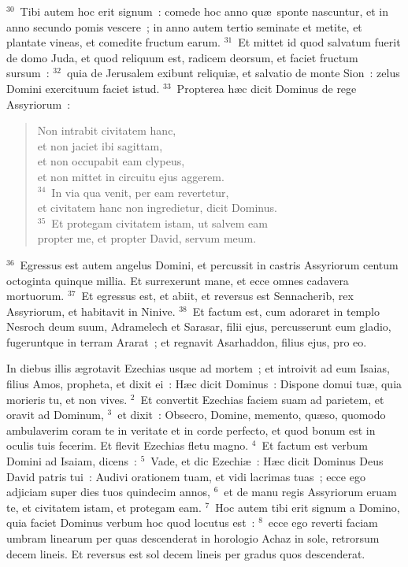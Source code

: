 ${}^{30}$~Tibi autem hoc erit signum~: comede hoc anno qu\ae\ sponte nascuntur, et in anno secundo pomis vescere~; in anno autem tertio seminate et metite, et plantate vineas, et comedite fructum earum.
${}^{31}$~Et mittet id quod salvatum fuerit de domo Juda, et quod reliquum est, radicem deorsum, et faciet fructum sursum~:
${}^{32}$~quia de Jerusalem exibunt reliqui\ae , et salvatio de monte Sion~: zelus Domini exercituum faciet istud.
${}^{33}$~Propterea h\ae c dicit Dominus de rege Assyriorum~: \begin{flushleft}\begin{verse}Non intrabit civitatem hanc,\\ et non jaciet ibi sagittam,\\ et non occupabit eam clypeus,\\ et non mittet in circuitu ejus aggerem.\\
${}^{34}$~In via qua venit, per eam revertetur,\\ et civitatem hanc non ingredietur, dicit Dominus.\\
${}^{35}$~Et protegam civitatem istam, ut salvem eam\\ propter me, et propter David, servum meum.\end{verse}\end{flushleft}


${}^{36}$~Egressus est autem angelus Domini, et percussit in castris Assyriorum centum octoginta quinque millia. Et surrexerunt mane, et ecce omnes cadavera mortuorum.
${}^{37}$~Et egressus est, et abiit, et reversus est Sennacherib, rex Assyriorum, et habitavit in Ninive.
${}^{38}$~Et factum est, cum adoraret in templo Nesroch deum suum, Adramelech et Sarasar, filii ejus, percusserunt eum gladio, fugeruntque in terram Ararat~; et regnavit Asarhaddon, filius ejus, pro eo.

\lettrine[lines=3,image=true,loversize=0.05,lraise=-0.03]{I}{}n diebus illis \ae grotavit Ezechias usque ad mortem~; et introivit ad eum Isaias, filius Amos, propheta, et dixit ei~: H\ae c dicit Dominus~: Dispone domui tu\ae , quia morieris tu, et non vives.
${}^{2}$~Et convertit Ezechias faciem suam ad parietem, et oravit ad Dominum,
${}^{3}$~et dixit~: Obsecro, Domine, memento, qu\ae so, quomodo ambulaverim coram te in veritate et in corde perfecto, et quod bonum est in oculis tuis fecerim. Et flevit Ezechias fletu magno.
${}^{4}$~Et factum est verbum Domini ad Isaiam, dicens~:
${}^{5}$~Vade, et dic Ezechi\ae~: H\ae c dicit Dominus Deus David patris tui~: Audivi orationem tuam, et vidi lacrimas tuas~; ecce ego adjiciam super dies tuos quindecim annos,
${}^{6}$~et de manu regis Assyriorum eruam te, et civitatem istam, et protegam eam.
${}^{7}$~Hoc autem tibi erit signum a Domino, quia faciet Dominus verbum hoc quod locutus est~:
${}^{8}$~ecce ego reverti faciam umbram linearum per quas descenderat in horologio Achaz in sole, retrorsum decem lineis. Et reversus est sol decem lineis per gradus quos descenderat.


